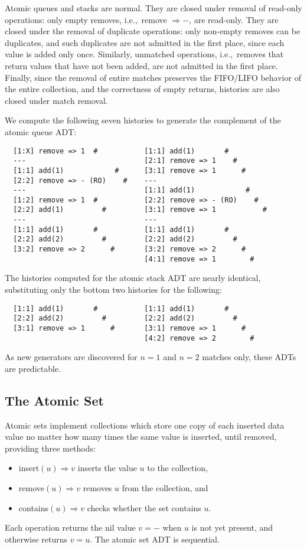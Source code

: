 Atomic queues and stacks are
normal. They are closed under removal of read-only operations: only empty
removes, i.e.,~remove $\Rightarrow -$, are read-only. They are
closed under the removal of duplicate operations: only non-empty removes can be
duplicates, and such duplicates are not admitted in the first place, since each
value is added only once. Similarly, unmatched operations, i.e.,~removes that
return values that have not been added, are not admitted in the first place.
Finally, since the removal of entire matches preserves the FIFO/LIFO behavior
of the entire collection, and the correctness of empty returns, histories are
also closed under match removal.

We compute the following seven histories to generate the complement of the
atomic queue ADT:
\begin{verbatim}
  [1:X] remove => 1  #           [1:1] add(1)       #
  ---                            [2:1] remove => 1    #
  [1:1] add(1)            #      [3:1] remove => 1      #
  [2:2] remove => - (RO)    #    ---
  ---                            [1:1] add(1)            #
  [1:2] remove => 1  #           [2:2] remove => - (RO)    #
  [2:2] add(1)         #         [3:1] remove => 1           #
  ---                            ---
  [1:1] add(1)       #           [1:1] add(1)       #
  [2:2] add(2)         #         [2:2] add(2)         #
  [3:2] remove => 2      #       [3:2] remove => 2      #
                                 [4:1] remove => 1        #
\end{verbatim}
The histories computed for the atomic stack ADT are nearly identical,
substituting only the bottom two histories for the following:
\begin{verbatim}
  [1:1] add(1)       #           [1:1] add(1)       #
  [2:2] add(2)         #         [2:2] add(2)         #
  [3:1] remove => 1      #       [3:1] remove => 1      #
                                 [4:2] remove => 2        #
\end{verbatim}
As new generators are discovered for $n=1$ and $n=2$ matches only, these ADTs
are predictable.

\subsection{The Atomic Set}

Atomic sets implement collections which store one copy of each inserted data
value no matter how many times the same value is inserted, until removed,
providing three methods:
\begin{itemize}

  \item insert$(u) \Rightarrow v$ inserts the value $u$ to the collection,

  \item remove$(u) \Rightarrow v$ removes $u$ from the collection, and

  \item contains$(u) \Rightarrow v$ checks whether the set contains $u$.

\end{itemize}
Each operation returns the nil value $v = -$ when $u$ is not yet
present, and otherwise returns $v = u$. The atomic set ADT is sequential.

